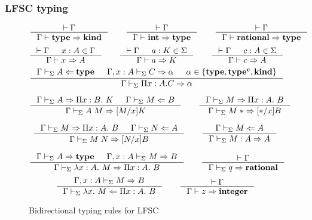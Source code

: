 \documentclass[10pt,t]{beamer}
\newcommand{\tycheck}[2]{#1 \Leftarrow #2}
\newcommand{\synth}[2]{#1 \Rightarrow #2}
\newcommand{\contextcons}[1]{\Gamma,#1\vdash_{\Sigma}}
\newcommand{\context}{\Gamma\vdash_{\Sigma}}
\newcommand{\subst}[3]{[#1/#2]#3}
\begin{document}
\begin{frame}[c]
  \frametitle{LFSC typing}
{\footnotesize
\begin{figure}[h!]
\begin{equation*}
\inference[]{\vdash \Gamma}
{\Gamma \vdash \mathbf{type} \Rightarrow \mathbf{kind}}
\qquad
\inference[]{\vdash \Gamma}
{\Gamma \vdash \mathbf{int} \Rightarrow \mathbf{type}}
\qquad
\inference[]{\vdash \Gamma}
{\Gamma \vdash \mathbf{rational} \Rightarrow \mathbf{type}}
\end{equation*}
\begin{equation*}
\inference[]{\vdash \Gamma & x: A \in \Gamma}
{\Gamma \vdash \synth{x}{A} }
\qquad
\inference[]{\vdash \Gamma & a: K \in \Sigma}
{\Gamma \vdash \synth{a}{K} }
\qquad
\inference[]{\vdash \Gamma & c: A \in \Sigma}
{\Gamma \vdash \synth{c}{A} }
\end{equation*}
\begin{equation*}
\inference[]{\context \tycheck{A}{\mathbf{type}} & \contextcons{x : A} \synth{C}{\alpha} & \alpha \in \{ \mathbf{type}, \mathbf{type^c}, \mathbf{kind} \}  }
{\context \synth{\Pi x : A. C}{\alpha} }
\end{equation*}

\begin{equation*}
\inference[]{\context \synth{A}{\Pi x : B. \ K} & \context \tycheck{M}{B} }
{\context \synth{A \; M}{\subst{M}{x}{K}} }
\qquad
\inference[]{ \context \synth{M}{\Pi x : A. \ B}}
{\context \synth{M \; *}{\subst{*}{x}{B}} }
\end{equation*}

\begin{equation*}
\inference[]{ \context \synth{M}{\Pi x : A. \ B} & \context \tycheck{N}{A} }
{\context \synth{M \; N}{\subst{N}{x}{B}} }
\qquad
\inference[]{\context \tycheck{M}{A} }
{\context \synth{M : A}{A} }
\end{equation*}

\begin{equation*}
\inference[]{\context \synth{A}{\mathbf{type}} & \contextcons{x : A} \synth{M}{B}  }
{\context \synth{\lambda x : A. \ M}{\Pi x : A. \ B} }
\qquad
\inference[]{\vdash \Gamma}
{\context q \Rightarrow \mathbf{rational}}
\end{equation*}
\begin{equation*}
\inference[]{\contextcons{x : A} \synth{M}{B}  }
{\context \tycheck{\lambda x. \ M}{\Pi x : A. \ B} }
\qquad
\inference[]{\vdash \Gamma}
{\Gamma \vdash z \Rightarrow \mathbf{integer}}
\end{equation*}
\caption{Bidirectional typing rules for LFSC}
\end{figure}
}
\end{frame}
\end{document}
